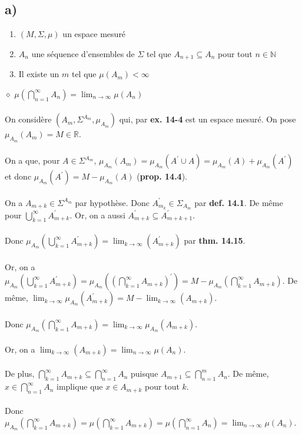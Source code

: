 \documentclass[a4paper,10pt]{article}
\begin{document}
\subsection*{a)}
\begin{enumerate}
	\item $(M, \Sigma, \mu)$ un espace mesuré
	\item $A_n$ une séquence d'ensembles de $\Sigma$ tel que $A_{n+1} \subseteq A_n$ pour tout $n \in \mathbb{N}$
	\item Il existe un $m$ tel que $\mu(A_m) < \infty$
\end{enumerate}
$\diamond$ \textbf{$\mu \left(\displaystyle\bigcap_{n=1}^\infty A_n \right) = \displaystyle\lim_{n \to \infty} \mu(A_n)$}
\\
\\
On considère $(A_m, \Sigma^{A_m}, \mu_{A_m})$ qui, par \textbf{ex. 14-4} est un espace mesuré. On pose $\mu_{A_m} (A_m) = M \in \mathbb{R}$.
\\
\\
On a que, pour $A \in \Sigma^{A_m}$, $\mu_{A_m} (A_m) = \mu_{A_m} (A^\prime \cup A) = \mu_{A_m} (A) + \mu_{A_m} (A^\prime)$ et donc $\mu_{A_m} (A^\prime) = M - \mu_{A_m}(A)$ (\textbf{prop. 14.4}). 
\\
\\
On a $A_{m+k} \in \Sigma^{A_m}$ par hypothèse. Donc $A_{m_k}^\prime \in \Sigma_{A_m}$ par \textbf{def. 14.1}. De même pour $\bigcup_{k=1}^\infty A_{m+k}^\prime$. Or, on a aussi $A_{m+k}^\prime \subseteq A_{m+k+1}^\prime$.
\\
\\
Donc $\mu_{A_m} (\bigcup_{k=1}^\infty A_{m+k}^\prime) = \lim_{k \to \infty} (A_{m + k}^\prime)$ par \textbf{thm. 14.15}.
\\
\\
Or, on a $\mu_{A_m} (\bigcup_{k=1}^\infty A_{m+k}^\prime) = \mu_{A_m} ((\bigcap_{k=1}^\infty A_{m+k})^\prime) = M - \mu_{A_m}(\bigcap_{k=1}^\infty A_{m+k})$. De même, $\lim_{k \to \infty} \mu_{A_m} (A_{m+k}^\prime) = M - \lim_{k \to \infty} (A_{m+k})$.
\\
\\
Donc $\mu_{A_m} (\bigcap_{k=1}^\infty A_{m+k}) = \lim_{k \to \infty} \mu_{A_m} (A_{m+k})$.
\\
\\
Or, on a $\lim_{k \to \infty} (A_{m+k}) = \lim_{n \to \infty} \mu (A_n)$.
\\
\\
De plus, $\bigcap_{k=1}^\infty A_{m+k} \subseteq \bigcap_{n=1}^\infty A_n$ puisque $A_{m+1} \subseteq \bigcap_{n=1}^{m} A_n$. De même, $x \in \bigcap_{n=1}^\infty A_n$ implique que $x \in A_{m+k}$ pour tout $k$. 
\\
\\
Donc $\mu_{A_m} (\bigcap_{k=1}^\infty A_{m+k}) = \mu (\bigcap_{k=1}^\infty A_{m+k}) = \mu (\bigcap_{n=1}^\infty A_n) = \lim_{n \to \infty} \mu (A_n)$.
\end{document}
